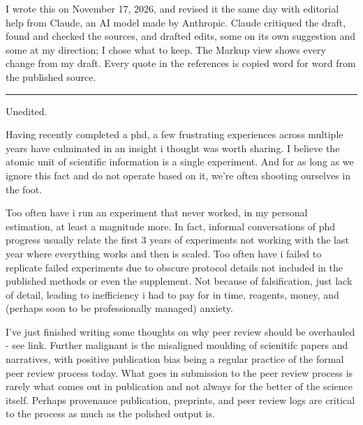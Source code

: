 \documentclass[12pt]{article}
\begin{document}
\clearpage
{\fontsize{11.7}{16.38}\selectfont\setlength{\parindent}{0pt}\setlength{\parskip}{6pt}
\par
I wrote this on November 17, 2026, and revised it the same day with editorial help from Claude, an AI model made by Anthropic. Claude critiqued the draft, found and checked the sources, and drafted edits, some on its own suggestion and some at my direction; I chose what to keep. The Markup view shows every change from my draft. Every quote in the references is copied word for word from the published source.\par
\vspace{10pt}
{\color{rule}\noindent\rule{\textwidth}{0.4pt}}\par
{} Unedited.\par
}
\fontsize{13.0}{18.85}\selectfont\setlength{\parskip}{6.5pt}
Having recently completed a phd, a few frustrating experiences across multiple years have culminated in an insight i thought was worth sharing. I believe the atomic unit of scientific information is a single experiment. And for as long as we ignore this fact and do not operate based on it, we're often shooting ourselves in the foot.

Too often have i run an experiment that never worked, in my personal estimation, at least a magnitude more. In fact, informal conversations of phd progress usually relate the first 3 years of experiments not working with the last year where everything works and then is scaled. Too often have i failed to replicate failed experiments due to obscure protocol details not included in the published methods or even the supplement. Not because of falsification, just lack of detail, leading to inefficiency i had to pay for in time, reagents, money, and (perhaps soon to be professionally managed) anxiety.

I've just finished writing some thoughts on why peer review should be overhauled - see link. Further malignant is the misaligned moulding of scienitifc papers and narratives, with positive publication bias being a regular practice of the formal peer review process today. What goes in submission to the peer review process is rarely what comes out in publication and not always for the better of the science itself. Perhaps provenance publication, preprints, and peer review logs are critical to the process as much as the polished output is.
\end{document}
